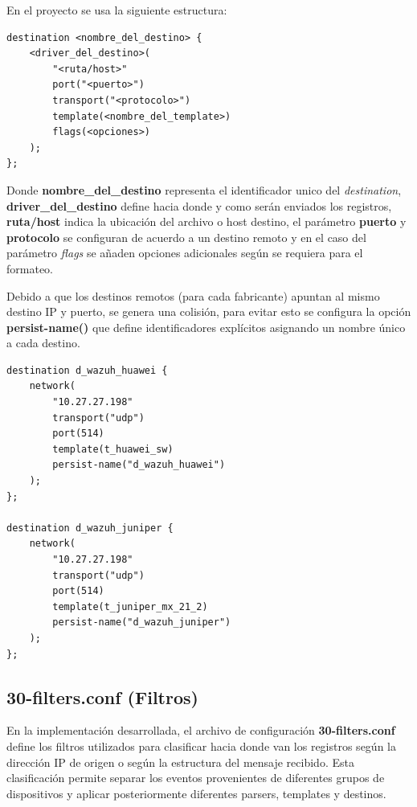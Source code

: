 En el proyecto se usa la siguiente estructura:

\begin{lstlisting}[style=logstyle,
    caption={Estructura de la configuracion de destinos presente en el servidor centralizado de logs.}
]
destination <nombre_del_destino> {
    <driver_del_destino>(
        "<ruta/host>"
        port("<puerto>")
        transport("<protocolo>")
        template(<nombre_del_template>)
        flags(<opciones>)
    );
};
\end{lstlisting}

Donde \textbf{nombre\_del\_destino} representa el identificador unico del \textit{destination}, \textbf{driver\_del\_destino} define hacia donde y como serán enviados los registros, \textbf{ruta/host} indica la ubicación del archivo o host destino, el parámetro \textbf{puerto} y \textbf{protocolo} se configuran de acuerdo a un destino remoto y en el caso del parámetro \textit{flags} se añaden opciones adicionales según se requiera para el formateo.

Debido a que los destinos remotos (para cada fabricante) apuntan al mismo destino IP y puerto, se genera una colisión, para evitar esto se configura la opción \textbf{persist-name()} que define identificadores explícitos asignando un nombre único a cada destino.

\begin{lstlisting}[style=logstyle,
    caption={Definicion de destinations apuntando al servior Wazuh con identificadores persistentes para evitar la colision.}
]
destination d_wazuh_huawei {
    network(
        "10.27.27.198"
        transport("udp")
        port(514)
        template(t_huawei_sw)
        persist-name("d_wazuh_huawei")
    );
};

destination d_wazuh_juniper {
    network(
        "10.27.27.198"
        transport("udp")
        port(514)
        template(t_juniper_mx_21_2)
        persist-name("d_wazuh_juniper")
    );
};
\end{lstlisting}

\subsection{30-filters.conf (Filtros)}
En la implementación desarrollada, el archivo de configuración \textbf{30-filters.conf} define los filtros utilizados para clasificar hacia donde van los registros según la dirección IP de origen o según la estructura del mensaje recibido. Esta clasificación permite separar los eventos provenientes de diferentes grupos de dispositivos y aplicar posteriormente diferentes parsers, templates y destinos.

